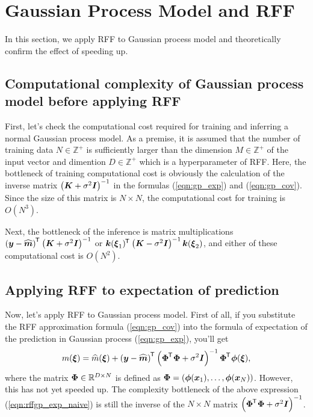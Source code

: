 \documentclass[twocolumn,a4paper,10pt]{article}
\begin{document}

\section{Gaussian Process Model and RFF}\titlebar

In this section, we apply RFF to Gaussian process model
and theoretically confirm the effect of speeding up.

\subsection{Computational complexity of Gaussian process model before applying RFF}

First, let's check the computational cost required for training and inferring a normal Gaussian
process model. As a premise, it is assumed that the number of training data $N \in \mathbb{Z}^{+}$
is sufficiently larger than the dimension $M \in \mathbb{Z}^{+}$ of the input vector and 
dimention $D \in \mathbb{Z}^{+}$ which is a hyperparameter of RFF. Here, the bottleneck of
training computational cost is obviously the calculation of the inverse matrix
$\left (\boldsymbol{K} + \sigma^2 \boldsymbol{I} \right)^{-1}$ in the formulas (\ref{eqn:gp_exp}) and (\ref{eqn:gp_cov}).
Since the size of this matrix is $N \times N$, the computational cost for training is $O(N^3)$.

Next, the bottleneck of the inference is matrix multiplications
$\left (\boldsymbol{y} -\widehat{\boldsymbol{m}} \right)^{\mkern-1.5mu\mathsf{T}}\hspace{0.5pt} \left( \boldsymbol{K} + \sigma^2 \boldsymbol{I} \right)^{-1}$ or
$\boldsymbol{k} (\boldsymbol{\xi}_1)^{\mkern-1.5mu\mathsf{T}}\hspace{0.5pt} \left( \boldsymbol{K} - \sigma^2 \boldsymbol{I} \right)^{-1} \boldsymbol{k} (\boldsymbol{\xi}_2)$,
and either of these computational cost is $O(N^2)$.

\subsection{Applying RFF to expectation of prediction}

Now, let's apply RFF to Gaussian process model. First of all, if you substitute the RFF
approximation formula (\ref{eqn:gp_cov}) into the formula of expectation of the prediction
in Gaussian process (\ref{eqn:gp_exp}), you'll get
\begin{equation}
    m (\boldsymbol{\xi}) = \widehat{m} (\boldsymbol{\xi}) + \left( \boldsymbol{y} - \widehat{\boldsymbol{m}} \right)^{\mkern-1.5mu\mathsf{T}}\hspace{0.5pt}
    \left( \boldsymbol{\Phi}^{\mkern-1.5mu\mathsf{T}}\hspace{0.5pt} \boldsymbol{\Phi} + \sigma^2 \boldsymbol{I} \right)^{-1} \boldsymbol{\Phi}^{\mkern-1.5mu\mathsf{T}}\hspace{0.5pt} \boldsymbol{\phi} (\boldsymbol{\xi}),
    \label{eqn:rffgp_exp_naive}
\end{equation}
where the matrix $\boldsymbol{\Phi} \in \mathbb{R}^{D \times N}$ is defined as
$\boldsymbol{\Phi} = (\boldsymbol{\phi} (\boldsymbol{x}_1), \ldots, \boldsymbol{\phi} (\boldsymbol{x}_N))$.
However, this has not yet speeded up. The complexity bottleneck of the above expression
(\ref{eqn:rffgp_exp_naive}) is still the inverse of the $N \times N$ matrix
$\left( \boldsymbol{\Phi}^{\mkern-1.5mu\mathsf{T}}\hspace{0.5pt} \boldsymbol{\Phi} + \sigma^2 \boldsymbol{I} \right)^{-1}$.
\end{document}

